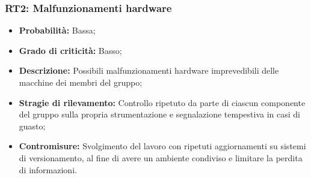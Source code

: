 \subsubsection{RT2: Malfunzionamenti hardware}
\begin{itemize}
    \item \textbf{Probabilità:} Bassa;
    \item \textbf{Grado di criticità:} Basso;
    \item \textbf{Descrizione:} Possibili malfunzionamenti hardware imprevedibili delle macchine dei membri del gruppo;
    \item \textbf{Stragie di rilevamento:} Controllo ripetuto da parte di ciascun componente del gruppo sulla propria strumentazione e segnalazione tempestiva in casi di guasto;
    \item \textbf{Contromisure:} Svolgimento del lavoro con ripetuti aggiornamenti su sistemi di versionamento, al fine di avere un ambiente condiviso e limitare la perdita di informazioni.  
\end{itemize}

